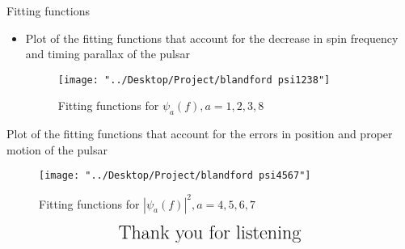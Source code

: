 \documentclass{beamer}
\begin{document}
\begin{frame}{Fitting functions}

\begin{itemize}
	\item Plot of the fitting functions that account for the decrease in spin frequency and timing parallax of the pulsar
\begin{figure}
	\centering
	\texttt{[image: "../Desktop/Project/blandford psi1238"]}
	\caption{Fitting functions for $\psi_a(f), a=1,2,3,8$}
	\label{fig:blandford-psi1238}
\end{figure}
\end{itemize}
\end{frame}

\begin{frame}
\item Plot of the fitting functions that account for the errors in position and proper motion of the pulsar

\begin{figure}
	\centering
	\texttt{[image: "../Desktop/Project/blandford psi4567"]}
	\caption{Fitting functions for $|\psi_a(f)|^2, a=4,5,6,7$}
	\label{fig:blandford-psi4567}
\end{figure}
\end{frame}

\begin{frame} 
$$\LARGE \text{Thank you for listening}$$
\end{frame}
\end{document}
